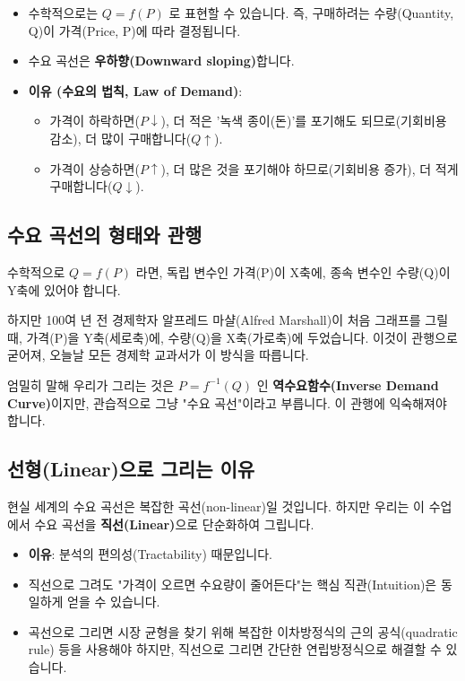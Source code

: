 \documentclass[11pt,a4paper]{book}
\theoremstyle{definition}
\begin{document}
\begin{itemize}
    \item 수학적으로는 $Q = f(P)$ 로 표현할 수 있습니다. 즉, 구매하려는 수량(Quantity, Q)이 가격(Price, P)에 따라 결정됩니다.
    \item 수요 곡선은 \textbf{우하향(Downward sloping)}합니다.
    \item \textbf{이유 (수요의 법칙, Law of Demand)}:
        \begin{itemize}
            \item 가격이 하락하면($P \downarrow$), 더 적은 '녹색 종이(돈)'를 포기해도 되므로(기회비용 감소), 더 많이 구매합니다($Q \uparrow$).
            \item 가격이 상승하면($P \uparrow$), 더 많은 것을 포기해야 하므로(기회비용 증가), 더 적게 구매합니다($Q \downarrow$).
        \end{itemize}
\end{itemize}

\subsection{수요 곡선의 형태와 관행}

\begin{keypointbox}[title={주의: 축(Axis)이 반대로 되어 있습니다}]
    수학적으로 $Q = f(P)$ 라면, 독립 변수인 가격(P)이 X축에, 종속 변수인 수량(Q)이 Y축에 있어야 합니다.

    하지만 100여 년 전 경제학자 알프레드 마샬(Alfred Marshall)이 처음 그래프를 그릴 때, 가격(P)을 Y축(세로축)에, 수량(Q)을 X축(가로축)에 두었습니다.
    이것이 관행으로 굳어져, 오늘날 모든 경제학 교과서가 이 방식을 따릅니다.

    엄밀히 말해 우리가 그리는 것은 $P = f^{-1}(Q)$ 인 \textbf{역수요함수(Inverse Demand Curve)}이지만, 관습적으로 그냥 "수요 곡선"이라고 부릅니다. 이 관행에 익숙해져야 합니다.
\end{keypointbox}

\subsection{선형(Linear)으로 그리는 이유}

현실 세계의 수요 곡선은 복잡한 곡선(non-linear)일 것입니다.
하지만 우리는 이 수업에서 수요 곡선을 \textbf{직선(Linear)}으로 단순화하여 그립니다.

\begin{itemize}
    \item \textbf{이유}: 분석의 편의성(Tractability) 때문입니다.
    \item 직선으로 그려도 "가격이 오르면 수요량이 줄어든다"는 핵심 직관(Intuition)은 동일하게 얻을 수 있습니다.
    \item 곡선으로 그리면 시장 균형을 찾기 위해 복잡한 이차방정식의 근의 공식(quadratic rule) 등을 사용해야 하지만, 직선으로 그리면 간단한 연립방정식으로 해결할 수 있습니다.
\end{itemize}
\end{document}
